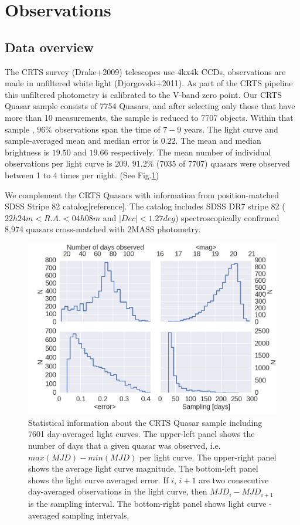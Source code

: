 \documentclass[a4paper,fleqn,usenatbib]{mnras}
\begin{document}
\section{Observations}
\label{sec:obs}

\subsection{Data overview}

The CRTS survey (Drake+2009) telescopes use 4kx4k CCDs, observations are made in unfiltered white light (Djorgovski+2011).  As part of the CRTS pipeline this unfiltered photometry is calibrated to the V-band zero point. Our CRTS Quasar sample consists of 7754 Quasars, and after selecting only those that have more than 10 measurements, the sample is reduced to 7707 objects. Within that sample , $96 \% $ observations span the time of $7-9$ years. The light curve and sample-averaged mean and median error is $0.22$. The mean and median brightness is $19.50$ and  $19.66$ respectively. The mean number of individual observations per light curve  is $209$. $91.2\%$ (7035 of 7707) quasars were observed between 1 to 4 times per night.  (See Fig.\ref{fig:CRTS_QSO_stats})

We complement the CRTS Quasars with information from position-matched SDSS Stripe 82 catalog[reference]. The catalog includes SDSS DR7 stripe 82 ($22h 24m < R.A. < 04h 08m$ and $| Dec | < 1.27 deg$) spectroscopically confirmed  8,974 quasars cross-matched with 2MASS photometry. 

\begin{figure}
\label{fig:CRTS_QSO_stats}
 \includegraphics[width=\columnwidth]{Fig_1_Stats_CRTS_QSO_used.png}
 \caption{Statistical information about the CRTS Quasar sample including 7601 day-averaged light curves. The upper-left panel shows the number of days that a given quasar was observed, i.e. $max(MJD)-min(MJD)$ per light curve. The upper-right panel shows the average light curve magnitude. The bottom-left panel shows the light curve averaged error. If $i$, $i+1$ are two consecutive day-averaged observations in the light curve, then $MJD_{i} - MJD_{i+1}$ is the sampling interval. The bottom-right panel shows light curve - averaged sampling intervals.}
\end{figure}
\end{document}

